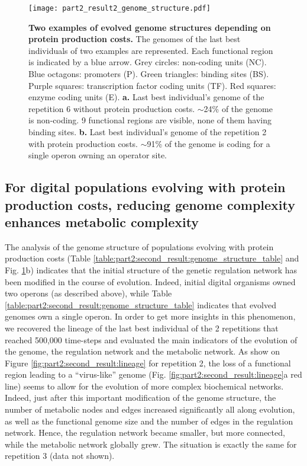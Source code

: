 \begin{figure}[!h]
\centering
\texttt{[image: part2\_result2\_genome\_structure.pdf]}
\caption[Two examples of evolved genome structures depending on protein production costs.]
{\textbf{Two examples of evolved genome structures depending on protein production costs.}
The genomes of the last best individuals of two examples are represented. Each functional region is indicated by a blue arrow. Grey circles: non-coding units (NC). Blue octagons: promoters (P). Green triangles: binding sites (BS). Purple squares: transcription factor coding units (TF). Red squares: enzyme coding units (E).
\textbf{a.} Last best individual's genome of the repetition 6 without protein production costs. $\sim$24\% of the genome is non-coding. 9 functional regions are visible, none of them having binding sites.
\textbf{b.} Last best individual's genome of the repetition 2 with protein production costs. $\sim$91\% of the genome is coding for a single operon owning an operator site.}
\label{fig:part2:second_result:genome_structure}
\end{figure}


\subsection{For digital populations evolving with protein production costs, reducing genome complexity enhances metabolic complexity}
\label{subsec:part2:second_result:genome_structure}

The analysis of the genome structure of populations evolving with protein production costs (Table \ref{table:part2:second_result:genome_structure_table} and Fig. \ref{fig:part2:second_result:genome_structure}b) indicates that the initial structure of the genetic regulation network has been modified in the course of evolution. Indeed, initial digital organisms owned two operons (as described above), while Table \ref{table:part2:second_result:genome_structure_table} indicates that evolved genomes own a single operon. In order to get more insights in this phenomenon, we recovered the lineage of the last best individual of the 2 repetitions that reached 500,000 time-steps and evaluated the main indicators of the evolution of the genome, the regulation network and the metabolic network. As show on Figure \ref{fig:part2:second_result:lineage} for repetition 2, the loss of a functional region leading to a ``virus-like'' genome (Fig. \ref{fig:part2:second_result:lineage}a red line) seems to allow for the evolution of more complex biochemical networks. Indeed, just after this important modification of the genome structure, the number of metabolic nodes and edges increased significantly all along evolution, as well as the functional genome size and the number of edges in the regulation network. Hence, the regulation network became smaller, but more connected, while the metabolic network globally grew. The situation is exactly the same for repetition 3 (data not shown).

